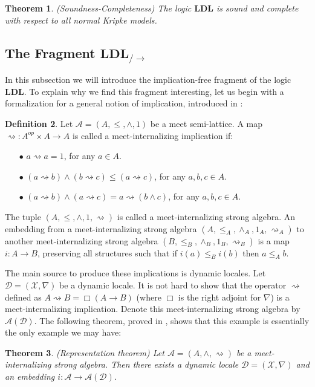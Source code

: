 \documentclass[12pt,a4paper]{article}
\theoremstyle{plain}
\newtheorem{thm}{Theorem}[section]
\theoremstyle{definition}
\newtheorem{dfn}[thm]{Definition}
\begin{document}
\begin{thm}(Soundness-Completeness) The logic $\mathbf{LDL}$ is sound and complete with respect to all normal Kripke models.
\end{thm}

\subsection{The Fragment $\mathbf{LDL}_{/\rightarrow}$}\label{sec:ldls}
In this subsection we will introduce the implication-free fragment of the logic $\mathbf{LDL}$. To explain why we find this fragment interesting, let us begin with a formalization for a general notion of implication, introduced in \cite{Amir}:
\begin{dfn}
Let $\mathcal{A}=(A, \leq, \wedge, 1)$ be a meet semi-lattice. A map $\rightsquigarrow : A^{op} \times A \to A$ is called a meet-internalizing implication if:
\begin{itemize}
\item[$\bullet$]
$a \rightsquigarrow a=1$, for any $a \in A$.
\item[$\bullet$]
$(a \rightsquigarrow b) \wedge (b \rightsquigarrow c) \leq (a \rightsquigarrow c)$, for any $a, b, c \in A$.
\item[$\bullet$]
$(a \rightsquigarrow b) \wedge (a \rightsquigarrow c)= a \rightsquigarrow (b \wedge c)$, for any $a, b, c \in A$.
\end{itemize}
The tuple $(A, \leq, \wedge, 1, \rightsquigarrow)$ is called a meet-internalizing strong algebra. An embedding from a meet-internalizing strong algebra $(A, \leq_A, \wedge_A, 1_A, \rightsquigarrow_A)$ to another meet-internalizing strong algebra $(B, \leq_B, \wedge_B, 1_B, \rightsquigarrow_B)$ is a map $i : A \to B$, preserving all structures such that if $i(a) \leq_B i(b)$ then $a \leq_A b$.
\end{dfn}
The main source to produce these implications is dynamic locales. Let $\mathcal{D}=(\mathscr{X}, \nabla)$ be a dynamic locale. It is not hard to show that the operator $\rightsquigarrow$ defined as $A \rightsquigarrow B = \Box (A \rightarrow B)$ (where $\Box$ is the right adjoint for $\nabla$) is a meet-internalizing implication. Denote this meet-internalizing strong algebra by $\mathcal{A}(\mathcal{D})$. The following theorem, proved in \cite{Amir}, shows that this example is essentially the only example we may have:
\begin{thm}(Representation theorem)
Let $\mathcal{A}=(A, \wedge, \rightsquigarrow)$ be a meet-internalizing strong algebra. Then there exists a dynamic locale $\mathcal{D}=(\mathscr{X}, \nabla)$ and an embedding $i: \mathcal{A} \to \mathcal{A}(\mathcal{D})$.
\end{thm}
\end{document}
